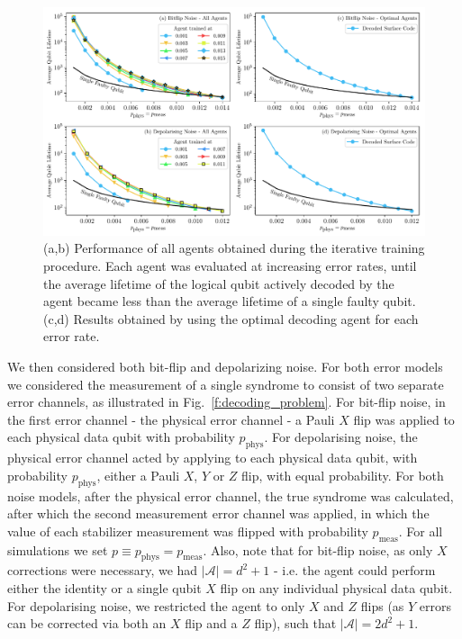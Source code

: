\documentclass[twocolumn,preprintnumbers,amsmath,amssymb,notitlepage,nofootinbib,longbibliography,superscriptaddress,aps,pra,10pt]{revtex4-1}
\begin{document}
	\begin{figure}
		\centering
		\includegraphics[width=\linewidth]{figures/final_results.pdf}
		\caption{(a,b) Performance of all agents obtained during the iterative training procedure. Each agent was evaluated at increasing error rates, until the average lifetime of the logical qubit actively decoded by the agent became less than the average lifetime of a single faulty qubit. (c,d) Results obtained by using the optimal decoding agent for each error rate.}\label{f:results}
	\end{figure}

	We then considered both bit-flip and depolarizing noise.
	For both error models we considered the measurement of a single syndrome to consist of two separate error channels, as illustrated in Fig.~\ref{f:decoding_problem}.
	For bit-flip noise, in the first error channel - the physical error channel - a Pauli $X$ flip was applied to each physical data qubit with probability $p_{\mathrm{phys}}$.
	For depolarising noise, the physical error channel acted by applying to each physical data qubit, with probability $p_{\mathrm{phys}}$, either a Pauli $X$, $Y$ or $Z$ flip, with equal probability.
	For both noise models, after the physical error channel, the true syndrome was calculated, after which the second measurement error channel was applied, in which the value of each stabilizer measurement was flipped with probability $p_{\mathrm{meas}}$.
	For all simulations we set $p \equiv p_{\mathrm{phys}} = p_{\mathrm{meas}}$.
	Also, note that for bit-flip noise, as only $X$ corrections were necessary, we had $|\mathcal{A}| = d^2 + 1$ - i.e. the agent could perform either the identity or a single qubit $X$ flip on any individual physical data qubit.
	For depolarising noise, we restricted the agent to only $X$ and $Z$ flips (as $Y$ errors can be corrected via both an $X$ flip and a $Z$ flip), such that $|\mathcal{A}| = 2d^2 + 1$.
\end{document}
